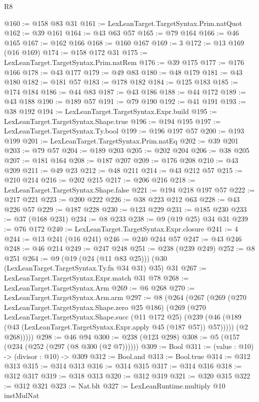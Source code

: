 \begin{lexlean}{R8}
\begin{coremodule}
@160 := @158 @83 @31
@161 := LexLeanTarget.TargetSyntax.Prim.natQuot
@162 := @39 @161
@164 := @43 @63 @57
@165 := @79 @164
@166 := @46 @165
@167 := @162 @166
@168 := @160 @167
@169 := 3
@172 := @13 @169 (@16 @169)
@174 := @158 @172 @31
@175 := LexLeanTarget.TargetSyntax.Prim.natRem
@176 := @39 @175
@177 := @176 @166
@178 := @43 @177
@179 := @49 @83
@180 := @48 @179
@181 := @43 @180
@182 := @181 @57
@183 := @178 @182
@184 := @125 @183
@185 := @174 @184
@186 := @44 @83
@187 := @43 @186
@188 := @44 @172
@189 := @43 @188
@190 := @189 @57
@191 := @79 @190
@192 := @41 @191
@193 := @38 @192
@194 := LexLeanTarget.TargetSyntax.Expr.build
@195 := LexLeanTarget.TargetSyntax.Shape.true
@196 := @194 @195
@197 := LexLeanTarget.TargetSyntax.Ty.bool
@199 := @196 @197 @57
@200 := @193 @199
@201 := LexLeanTarget.TargetSyntax.Prim.natEq
@202 := @39 @201
@203 := @79 @57
@204 := @189 @203
@205 := @202 @204
@206 := @38 @205
@207 := @181 @164
@208 := @187 @207
@209 := @176 @208
@210 := @43 @209
@211 := @49 @23
@212 := @48 @211
@214 := @43 @212 @57
@215 := @210 @214
@216 := @202 @215
@217 := @206 @216
@218 := LexLeanTarget.TargetSyntax.Shape.false
@221 := @194 @218 @197 @57
@222 := @217 @221
@223 := @200 @222
@226 := @38 @223 @212 @63
@228 := @43 @226 @57
@229 := @187 @228
@230 := @123 @229
@231 := @185 @230
@233 := @37 (@168 @231)
@234 := @8 @233
@238 := @9 (@19 @25) @34 @31
@239 := @76 @172
@240 := LexLeanTarget.TargetSyntax.Expr.closure
@241 := 4
@244 := @13 @241 (@16 @241)
@246 := @240 @244 @57
@247 := @43 @246
@248 := @46 @214
@249 := @247 @248
@251 := @238 (@239 @249)
@252 := @8 @251
@264 := @9 (@19 (@24 (@11 @83 @25))) (@30 (LexLeanTarget.TargetSyntax.Ty.fn @34 @31) @35) @31
@267 := LexLeanTarget.TargetSyntax.Expr.match @31 @78
@268 := LexLeanTarget.TargetSyntax.Arm
@269 := @6 @268
@270 := LexLeanTarget.TargetSyntax.Arm.arm
@297 := @8
    (@264
      (@267
        (@269
          (@270 LexLeanTarget.TargetSyntax.Shape.zero @25 @186)
          (@269
            (@270
              LexLeanTarget.TargetSyntax.Shape.succ
              (@11 @172 @25)
              (@239 (@46 (@189 (@43 (LexLeanTarget.TargetSyntax.Expr.apply @45 (@187 @57)) @57)))))
            (@2 @268)))))
@298 := @46 @94
@300 := @238 (@123 @298)
@308 := @5 (@157 (@234 (@252 (@297 (@8 @300 (@2 @7))))))
@309 := Bool
@311 := (value : @10) -> (divisor : @10) -> @309
@312 := Bool.and
@313 := Bool.true
@314 := @312 @313
@315 := @314 @313
@316 := @314 @315
@317 := @314 @316
@318 := @312 @317
@319 := @318 @313
@320 := @312 @319
@321 := @320 @315
@322 := @312 @321
@323 := Nat.blt
@327 := LexLeanRuntime.multiply @10 instMulNat

\end{coremodule}
\end{lexlean}

